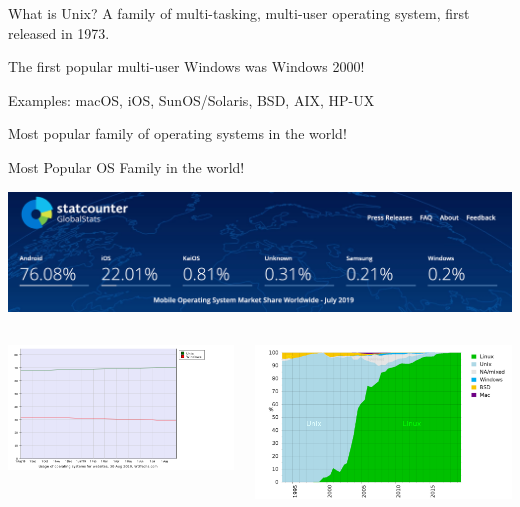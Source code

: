 \documentclass[11pt]{beamer}
\begin{document}
\begin{frame}{What is Unix?}
  A family of multi-tasking, multi-user operating system, first released in 1973.

  The first popular multi-user Windows was Windows 2000!

  Examples: macOS, iOS, SunOS/Solaris, BSD, AIX, HP-UX

  Most popular family of operating systems in the world!
\end{frame}

\begin{frame}{Most Popular OS Family in the world!}
  \begin{center}
    \includegraphics[width=0.75\linewidth]{phone-share}
  \end{center}

  \begin{columns}
    \begin{column}{0.5\linewidth}
      \includegraphics[width=\linewidth]{server}
    \end{column}
    \begin{column}{0.5\linewidth}
      \includegraphics[width=\linewidth]{supercomputer}
    \end{column}
  \end{columns}
\end{frame}
\end{document}
